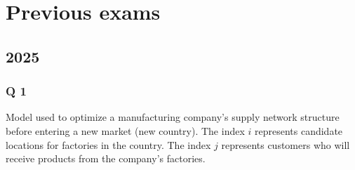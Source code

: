 \documentclass[10pt]{article}
\begin{document}
\section{Previous exams}
\subsection{2025}
\subsubsection{Q 1}
Model used to optimize a manufacturing company's supply network structure before entering a new market (new country). The index $i $ represents candidate locations for factories in the country. The index $j $ represents customers who will receive products from the company's factories. 
\end{document}

